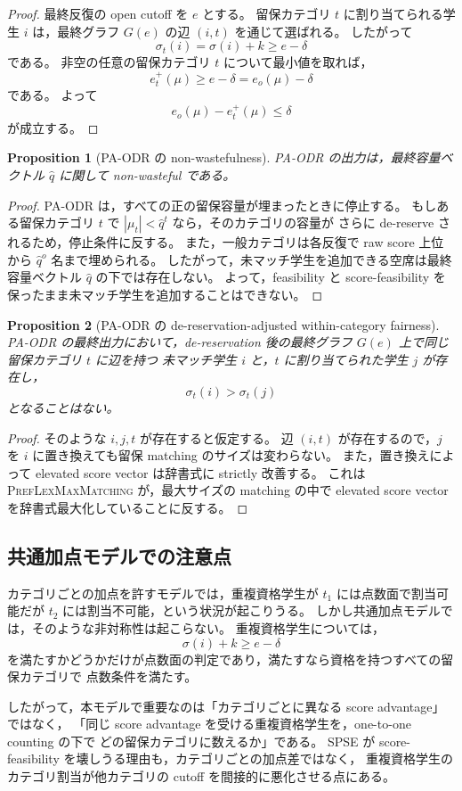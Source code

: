 \documentclass[
  12pt,
  a4paper,
  oneside,
  onecolumn,
  titlepage,
  final
]{jsarticle}
\newtheorem{proposition}{Proposition}
\newcommand{\1}{\mathbf{1}}
\begin{document}
\begin{proof}
最終反復の open cutoff を $e$ とする。
留保カテゴリ $t$ に割り当てられる学生 $i$ は，最終グラフ $G(e)$ の辺 $(i,t)$ を通じて選ばれる。
したがって
\[
    \sigma_t(i)=\sigma(i)+k\ge e-\delta
\]
である。
非空の任意の留保カテゴリ $t$ について最小値を取れば，
\[
    e_t^+(\mu)\ge e-\delta=e_o(\mu)-\delta
\]
である。
よって
\[
    e_o(\mu)-e_t^+(\mu)\le \delta
\]
が成立する。
\end{proof}

\begin{proposition}[PA-ODR の non-wastefulness]
PA-ODR の出力は，最終容量ベクトル $\hat q$ に関して non-wasteful である。
\end{proposition}

\begin{proof}
PA-ODR は，すべての正の留保容量が埋まったときに停止する。
もしある留保カテゴリ $t$ で $|\mu_t|<\hat q^t$ なら，そのカテゴリの容量が
さらに de-reserve されるため，停止条件に反する。
また，一般カテゴリは各反復で raw score 上位から $\hat q^o$ 名まで埋められる。
したがって，未マッチ学生を追加できる空席は最終容量ベクトル $\hat q$ の下では存在しない。
よって，feasibility と score-feasibility を保ったまま未マッチ学生を追加することはできない。
\end{proof}

\begin{proposition}[PA-ODR の de-reservation-adjusted within-category fairness]
PA-ODR の最終出力において，de-reservation 後の最終グラフ $G(e)$ 上で同じ留保カテゴリ $t$ に辺を持つ
未マッチ学生 $i$ と，$t$ に割り当てられた学生 $j$ が存在し，
\[
    \sigma_t(i)>\sigma_t(j)
\]
となることはない。
\end{proposition}

\begin{proof}
そのような $i,j,t$ が存在すると仮定する。
辺 $(i,t)$ が存在するので，$j$ を $i$ に置き換えても留保 matching のサイズは変わらない。
また，置き換えによって elevated score vector は辞書式に strictly 改善する。
これは \textsc{PrefLexMaxMatching} が，最大サイズの matching の中で
elevated score vector を辞書式最大化していることに反する。
\end{proof}

\subsection{共通加点モデルでの注意点}

カテゴリごとの加点を許すモデルでは，重複資格学生が
$t_1$ には点数面で割当可能だが $t_2$ には割当不可能，という状況が起こりうる。
しかし共通加点モデルでは，そのような非対称性は起こらない。
重複資格学生については，
\[
    \sigma(i)+k\ge e-\delta
\]
を満たすかどうかだけが点数面の判定であり，満たすなら資格を持つすべての留保カテゴリで
点数条件を満たす。

したがって，本モデルで重要なのは「カテゴリごとに異なる score advantage」ではなく，
「同じ score advantage を受ける重複資格学生を，one-to-one counting の下で
どの留保カテゴリに数えるか」である。
SPSE が score-feasibility を壊しうる理由も，カテゴリごとの加点差ではなく，
重複資格学生のカテゴリ割当が他カテゴリの cutoff を間接的に悪化させる点にある。

\end{document}

